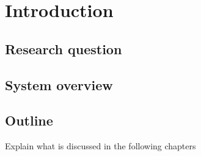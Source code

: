 \chapter{Introduction}

\section{Research question}


\section{System overview}


\section{Outline}
Explain what is discussed in the following chapters

